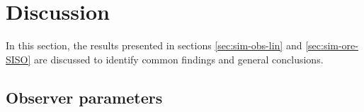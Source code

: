 %
%
%

\section{Discussion} \label{chap-results-discussion}

In this section, the results presented in sections \ref{sec:sim-obs-lin} and \ref{sec:sim-ore-SISO} are discussed to identify common findings and general conclusions.

\subsection{Observer parameters} \label{sec-disc-obs-params}

